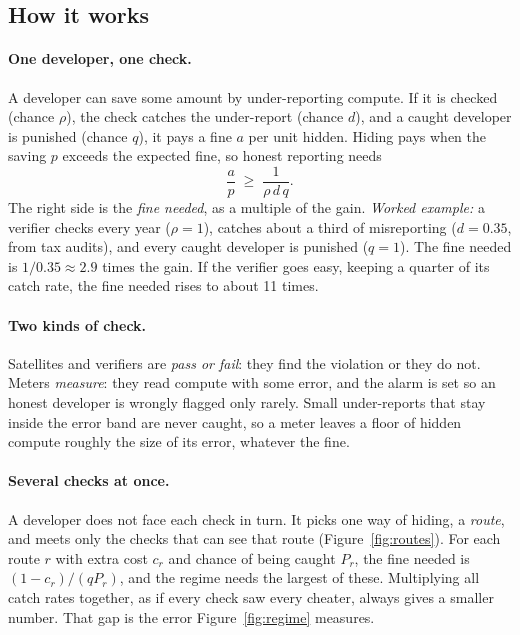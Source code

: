 \documentclass[11pt,a4paper]{article}
\newif\ifhighlight
\newenvironment{addedblock}{\ifhighlight\color{newtext}\fi}{}
\begin{document}
\begin{addedblock}
\subsection{How it works}
\paragraph{One developer, one check.} A developer can save some amount by under-reporting compute. If it is checked (chance $\rho$), the check catches the under-report (chance $d$), and a caught developer is punished (chance $q$), it pays a fine $a$ per unit hidden. Hiding pays when the saving $p$ exceeds the expected fine, so honest reporting needs
\[
  \frac{a}{p} \;\ge\; \frac{1}{\rho\, d\, q}.
\]
The right side is the \emph{fine needed}, as a multiple of the gain. \emph{Worked example:} a verifier checks every year ($\rho = 1$), catches about a third of misreporting ($d = 0.35$, from tax audits), and every caught developer is punished ($q = 1$). The fine needed is $1/0.35 \approx 2.9$ times the gain. If the verifier goes easy, keeping a quarter of its catch rate, the fine needed rises to about 11 times.

\paragraph{Two kinds of check.} Satellites and verifiers are \emph{pass or fail}: they find the violation or they do not. Meters \emph{measure}: they read compute with some error, and the alarm is set so an honest developer is wrongly flagged only rarely. Small under-reports that stay inside the error band are never caught, so a meter leaves a floor of hidden compute roughly the size of its error, whatever the fine.

\paragraph{Several checks at once.} A developer does not face each check in turn. It picks one way of hiding, a \emph{route}, and meets only the checks that can see that route (Figure~\ref{fig:routes}). For each route $r$ with extra cost $c_r$ and chance of being caught $P_r$, the fine needed is $(1-c_r)/(q P_r)$, and the regime needs the largest of these. Multiplying all catch rates together, as if every check saw every cheater, always gives a smaller number. That gap is the error Figure~\ref{fig:regime} measures.


\end{addedblock}
\end{document}
